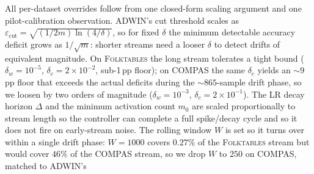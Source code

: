\documentclass[sigconf,anonymous,review]{acmart}
\begin{document}
All per-dataset overrides follow from one closed-form scaling argument and one pilot-calibration observation. ADWIN's cut threshold scales as
$\varepsilon_{\mathrm{cut}} = \sqrt{(1/2m)\ln(4/\delta)}$, so for fixed $\delta$ the minimum detectable accuracy deficit grows as $1/\sqrt{m}$: shorter
streams need a looser $\delta$ to detect drifts of equivalent magnitude. On \textsc{Folktables} the long stream tolerates a tight bound ($\delta_w{=}10^{-5}$,
$\delta_c{=}2{\times}10^{-2}$, sub-1\,pp floor); on \textsc{COMPAS} the same $\delta_c$ yields an $\sim$$9$\,pp floor that exceeds the actual deficits during the
$\sim$$865$-sample drift phase, so we loosen by two orders of magnitude ($\delta_w{=}10^{-3}$, $\delta_c{=}2{\times}10^{-1}$). The LR decay horizon $\Delta$
and the minimum activation count $m_0$ are scaled proportionally to stream length so the controller can complete a full spike/decay cycle and so it
does not fire on early-stream noise. The rolling window $W$ is set so it turns over within a single drift phase: $W=1000$ covers $0.27\%$ of the
\textsc{Folktables} stream but would cover $46\%$ of the \textsc{COMPAS} stream, so we drop $W$ to $250$ on \textsc{COMPAS}, matched to ADWIN's
\end{document}
